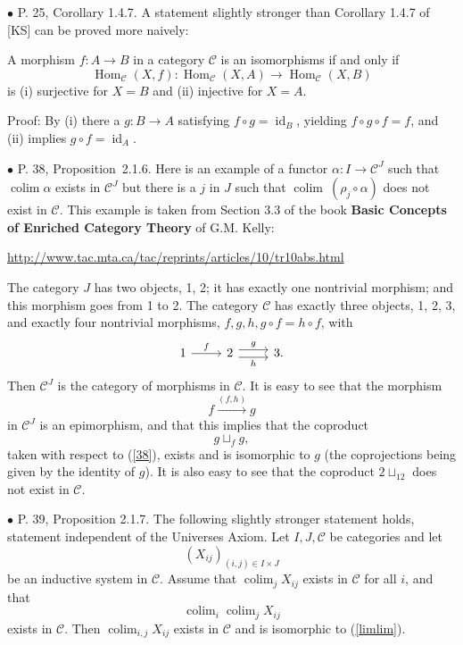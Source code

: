 \documentclass[12pt]{article}
\theoremstyle{remark}
\newcommand{\bu}{\bullet}
\newcommand{\n}{\noindent}
\newcommand{\C}{\mathcal C}
\newcommand{\pr}{Proposition}
\DeclareMathOperator*{\coli}{colim}
\DeclareMathOperator*{\co}{colim}
\DeclareMathOperator{\id}{id}
\DeclareMathOperator{\Hom}{Hom}
\begin{document}

\n$\bu$ P. 25, Corollary 1.4.7. A statement slightly stronger than Corollary 1.4.7 of [KS] can be proved more naively:

A morphism $f:A\to B$ in a category $\C$ is an isomorphisms if and only if 
$$
\Hom_\C(X,f):\Hom_\C(X,A)\to\Hom_\C(X,B)
$$
is (i) surjective for $X=B$ and (ii) injective for $X=A$.

Proof: By (i) there a $g:B\to A$ satisfying $f\circ g=\id_B$, yielding $f\circ g\circ f=f$, and (ii) implies $g\circ f=\id_A$. 


\n$\bu$ P. 38, \pr\ 2.1.6. Here is an example of a functor $\alpha:I\to\C^J$ such that $\co\alpha$ exists in $\C^J$ but there is a $j$ in $J$ such that $\co\ (\rho_j\circ\alpha)$ does not exist in $\C$. This example is taken from Section 3.3 of the book \textbf{Basic Concepts of Enriched Category Theory} of G.M. Kelly:\medskip 

\centerline{\href{http://www.tac.mta.ca/tac/reprints/articles/10/tr10abs.html}{http://www.tac.mta.ca/tac/reprints/articles/10/tr10abs.html}}

The category $J$ has two objects, 1, 2; it has exactly one nontrivial morphism; and this morphism goes from 1 to 2. The category $\C$ has exactly three objects, 1, 2, 3, and exactly four nontrivial morphisms, $f,g,h,g\circ f=h\circ f$, with 
$$
\begin{tikzcd}
1\ar{r}{f}&2\ar[yshift=.7ex]{r}{g}\ar[yshift=-.7ex]{r}[swap]{h}&3.
\end{tikzcd}
$$ 
Then $\C^J$ is the category of morphisms in $\C$. It is easy to see that the morphism 
%
\begin{equation}\label{38}
f\xrightarrow{(f,h)}g 
\end{equation}
%
in $\C^J$ is an epimorphism, and that this implies that the coproduct 
$$
g\sqcup_fg,
$$ 
taken with respect to (\ref{38}), exists and is isomorphic to $g$ (the coprojections being given by the identity of $g$). It is also easy to see that the coproduct $2\sqcup_12$ does not exist in $\C$. 


\n$\bu$ P. 39, Proposition 2.1.7. The following slightly stronger statement holds, statement independent of the Universes Axiom. Let $I, J, \C$ be categories and let 
$$
(X_{ij})_{(i,j)\in I\times J}
$$ 
be an inductive system in $\C$. Assume that $\coli_jX_{ij}$ exists in $\C$ for all $i$, and that 
\begin{equation}\label{limlim}
\coli_i\coli_jX_{ij}
\end{equation}
exists in $\C$. Then $\coli_{i,j}X_{ij}$ exists in $\C$ and is isomorphic to (\ref{limlim}).
\end{document}
